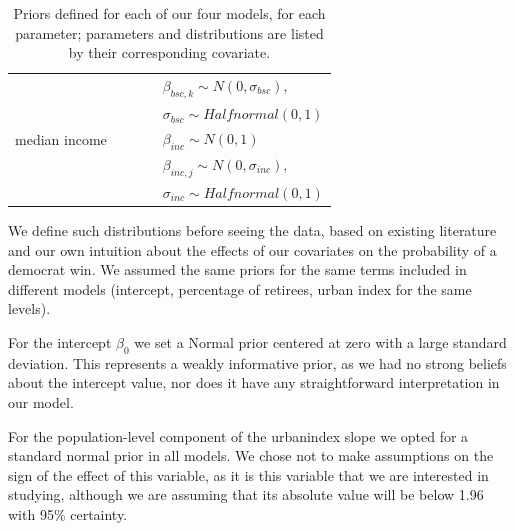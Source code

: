 \documentclass[12pt]{article}
\begin{document}
\begin{table}[h]
{\begin{tabular}{l|llll}
			              &                                          &                                          &                                              & $\beta_{bsc, k} \sim N(0, \sigma_{bsc}), $ \\
			              &                                          &                                          &                                              & $\sigma_{bsc} \sim Halfnormal(0,1)$        \\
			median income &                                          &                                          &                                              & $\beta_{inc} \sim N(0,1)$                    \\
			              &                                          &                                          &                                              & $\beta_{inc, j} \sim N(0, \sigma_{inc}), $ \\
			              &                                          &                                          &                                              & $\sigma_{inc} \sim Halfnormal(0,1)$        \\ \bottomrule
		\end{tabular}%
	}
	\caption{Priors defined for each of our four models, for each parameter; parameters and distributions are listed by their corresponding covariate.}
	\label{tab:priors}
\end{table}



We define such distributions before seeing the data, based on existing literature and our own intuition about the effects of our covariates on the probability of a democrat win.
We assumed the same priors for the same terms included in different models (intercept, percentage of retirees, urban index for the same levels).


For the intercept $\beta_0$ we set a Normal prior centered at zero with a large standard deviation. 
This represents a weakly informative prior, as we had no strong beliefs about the intercept value, nor does it have any straightforward interpretation in our model.


For the population-level component of the urbanindex slope we opted for a standard normal prior in all models. We chose not to make assumptions on the sign of the effect of this variable, as it is this variable that we are interested in studying, although we are assuming that its absolute value will be below 1.96 with 95\% certainty. 
\end{document}
